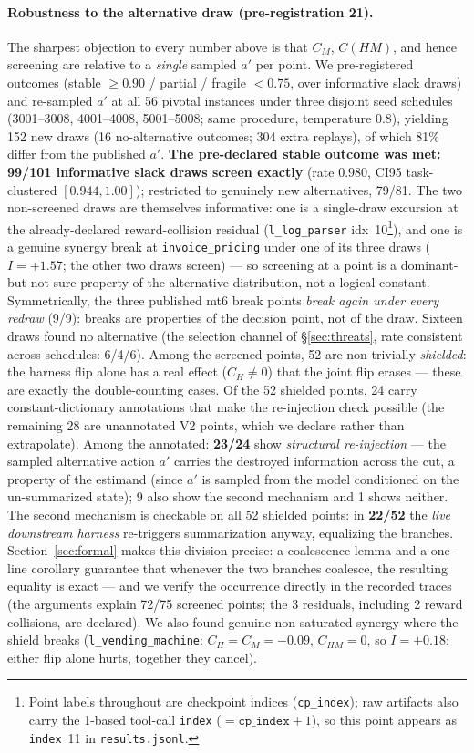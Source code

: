 \documentclass{article}
\theoremstyle{remark}
\begin{document}
\paragraph{Robustness to the alternative draw (pre-registration 21).} The
sharpest objection to every number above is that $C_M$, $C(HM)$, and hence
screening are relative to a \emph{single} sampled $a'$ per point. We
pre-registered outcomes (stable $\geq 0.90$ / partial / fragile $< 0.75$,
over informative slack draws) and re-sampled $a'$ at all 56 pivotal
instances under three disjoint seed schedules (3001--3008, 4001--4008,
5001--5008; same procedure, temperature $0.8$), yielding 152 new draws (16
no-alternative outcomes; 304 extra replays), of which 81\% differ from the
published $a'$. \textbf{The pre-declared stable outcome was met: 99/101
informative slack draws screen exactly} (rate $0.980$, CI95 task-clustered
$[0.944, 1.00]$); restricted to genuinely new alternatives, 79/81. The two
non-screened draws are themselves informative: one is a single-draw
excursion at the already-declared reward-collision residual
(\texttt{l\_log\_parser} idx~10\footnote{Point labels throughout are
checkpoint indices (\texttt{cp\_index}); raw artifacts also carry the
1-based tool-call \texttt{index} ($= \texttt{cp\_index}+1$), so this point
appears as \texttt{index}~11 in \texttt{results.jsonl}.}), and one is a genuine synergy break at
\texttt{invoice\_pricing} under one of its three draws ($I = +1.57$; the
other two draws screen) --- so screening at a point is a dominant-but-not-sure
property of the alternative distribution, not a logical constant.
Symmetrically, the three published mt6 break points \emph{break again under
every redraw} (9/9): breaks are properties of the decision point, not of
the draw. Sixteen draws found no alternative (the selection channel of
\S\ref{sec:threats}, rate consistent across schedules: 6/4/6). Among the screened points, 52 are non-trivially
\emph{shielded}: the harness flip
alone has a real effect ($C_H \neq 0$) that the joint flip erases --- these
are exactly the double-counting cases. Of the 52 shielded points, 24
carry constant-dictionary annotations that make the re-injection check
possible (the remaining 28 are unannotated V2 points, which we declare
rather than extrapolate). Among the annotated: \textbf{23/24} show
\emph{structural re-injection} --- the sampled alternative action $a'$
carries the destroyed information across the cut, a property of the estimand
(since $a'$ is sampled from the model conditioned on the un-summarized
state); 9 also show the second mechanism and 1 shows neither. The second
mechanism is checkable on all 52 shielded points: in \textbf{22/52} the
\emph{live downstream harness} re-triggers summarization anyway, equalizing
the branches. Section~\ref{sec:formal} makes this division precise: a
coalescence lemma and a one-line corollary guarantee that whenever the two
branches coalesce, the resulting equality is exact --- and we verify the
occurrence directly in the recorded traces (the arguments explain 72/75
screened points; the 3 residuals, including 2 reward collisions, are
declared). We also found genuine
non-saturated synergy where the shield breaks
(\texttt{l\_vending\_machine}: $C_H = C_M = -0.09$, $C_{HM} = 0$, so
$I = +0.18$: either flip alone hurts, together they cancel).
\end{document}
